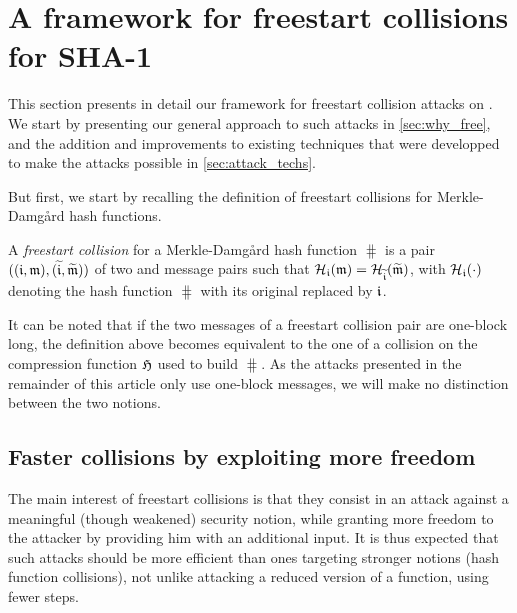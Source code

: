 \section{A framework for freestart collisions for SHA-1}

This section presents in detail our framework for freestart collision attacks on \shaone. We start by presenting our general approach to such attacks
in \autoref{sec:why_free}, and the addition and improvements to existing techniques that were developped to make the attacks possible in \autoref{sec:attack_techs}.

But first, we start by recalling the definition of freestart collisions for Merkle-Damg\aa rd hash functions.

\begin{defi}
A \emph{freestart collision} for a Merkle-Damg\aa rd hash function $\hash$ is a pair $((\mathfrak{i},\mathfrak{m}), (\widetilde{\mathfrak{i}},\widetilde{\mathfrak{m}}))$
of two \iv and message pairs such that $\operatorname{\mathcal{H}}_{\mathfrak{i}}(\mathfrak{m}) = \operatorname{\mathcal{H}}_{\widetilde{\mathfrak{i}}}(\widetilde{\mathfrak{m}})$, with $\operatorname{\mathcal{H}}_{\mathfrak{i}}(\cdot)$ denoting
the hash function $\hash$ with its original \iv replaced by $\mathfrak{i}$.
\end{defi}

It can be noted that if the two messages of a freestart collision pair are one-block long, the definition above becomes equivalent to the one of a collision
on the compression function $\operatorname{\mathfrak{H}}$ used to build $\hash$. As the attacks presented in the remainder of this article only use one-block messages, we
will make no distinction between the two notions. 


\subsection{Faster collisions by exploiting more freedom}
\label{sec:why_free}

The main interest of freestart collisions is that they consist in an attack against a meaningful (though weakened) security notion, while granting more freedom to
the attacker by providing him with an additional input. It is thus expected that such attacks should be more efficient than ones targeting stronger notions (\eg hash function
collisions), not unlike attacking a reduced version of a function, using fewer steps.

